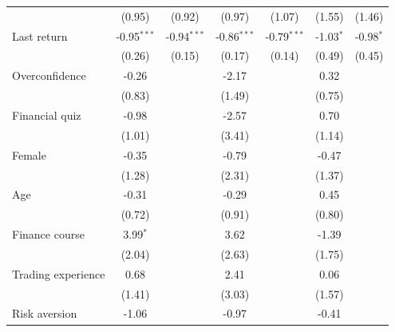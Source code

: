 \begin{tabular}{lcccccc}
                                     & (0.95)        & (0.92)        & (0.97)        & (1.07)        & (1.55)        & (1.46)\\   
   Last return                       & -0.95$^{***}$ & -0.94$^{***}$ & -0.86$^{***}$ & -0.79$^{***}$ & -1.03$^{*}$   & -0.98$^{*}$\\   
                                     & (0.26)        & (0.15)        & (0.17)        & (0.14)        & (0.49)        & (0.45)\\   
   Overconfidence                    & -0.26         &               & -2.17         &               & 0.32          &   \\   
                                     & (0.83)        &               & (1.49)        &               & (0.75)        &   \\   
   Financial quiz                    & -0.98         &               & -2.57         &               & 0.70          &   \\   
                                     & (1.01)        &               & (3.41)        &               & (1.14)        &   \\   
   Female                            & -0.35         &               & -0.79         &               & -0.47         &   \\   
                                     & (1.28)        &               & (2.31)        &               & (1.37)        &   \\   
   Age                               & -0.31         &               & -0.29         &               & 0.45          &   \\   
                                     & (0.72)        &               & (0.91)        &               & (0.80)        &   \\   
   Finance course                    & 3.99$^{*}$    &               & 3.62          &               & -1.39         &   \\   
                                     & (2.04)        &               & (2.63)        &               & (1.75)        &   \\   
   Trading experience                & 0.68          &               & 2.41          &               & 0.06          &   \\   
                                     & (1.41)        &               & (3.03)        &               & (1.57)        &   \\   
   Risk aversion                     & -1.06         &               & -0.97         &               & -0.41         &   \\   

\end{tabular}
